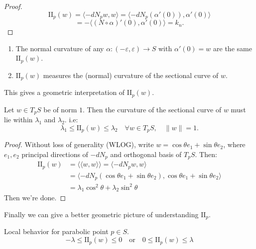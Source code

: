 \documentclass{article}
\begin{document}
\begin{proof}
$$ \mathrm{II}_p(w) = \langle -dN_p w, w \rangle = \langle -dN_p (\alpha'(0)), \alpha'(0) \rangle $$
$$ = - \langle (N \circ \alpha)'(0), \alpha'(0) \rangle = k_n. $$
\end{proof}

\begin{corollary}
\begin{enumerate}
    \item The normal curvature of any $\alpha: (-\varepsilon, \varepsilon) \to S$ with $\alpha'(0) = w$ are the same $\mathrm{II}_p(w)$.
    \item $\mathrm{II}_p(w)$ measures the (normal) curvature of the sectional curve of $w$.
\end{enumerate}
This gives a geometric interpretation of $\mathrm{II}_p(w)$.
\end{corollary}

\begin{corollary}
Let $w \in T_p S$ be of norm $1$. Then the curvature of the sectional curve of $w$ must lie within $\lambda_1$ and $\lambda_2$. i.e:
$$ \lambda_1 \le \mathrm{II}_p(w) \le \lambda_2 \quad \forall w \in T_p S, \quad \|w\| = 1. $$
\end{corollary}

\begin{proof}
Without loss of generality (WLOG), write $w = \cos\theta e_1 + \sin\theta e_2$, where $e_1, e_2$ principal directions of $-dN_p$ and orthogonal basis of $T_p S$.
Then:
\begin{align*}
\mathrm{II}_p(w) &= \langle\langle w, w \rangle\rangle = \langle -dN_p w, w \rangle \\
&= \langle -dN_p (\cos\theta e_1 + \sin\theta e_2), \cos\theta e_1 + \sin\theta e_2 \rangle \\
&= \lambda_1 \cos^2\theta + \lambda_2 \sin^2\theta
\end{align*}
Then we're done.
\end{proof}

\begin{remark}
Finally we can give a better geometric picture of understanding $\mathrm{II}_p$.
\end{remark}

\begin{example}

Local behavior for parabolic point $p \in S$.
$$ -\lambda \le \mathrm{II}_p(w) \le 0 \quad \text{or} \quad 0 \le \mathrm{II}_p(w) \le \lambda $$
\end{example}
\end{document}
